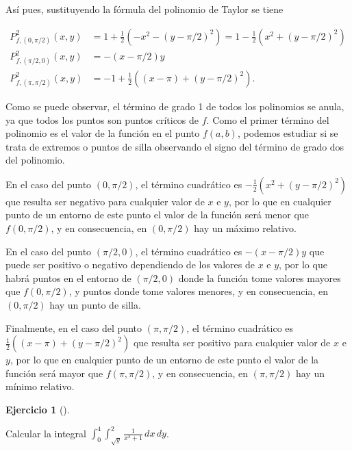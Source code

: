 \documentclass[
  a4paper,
]{scrreport}
\theoremstyle{definition}
\newtheorem{exercise}{Ejercicio}[chapter]
\theoremstyle{remark}
\begin{document}
\begin{tcolorbox}
Así pues, sustituyendo la fórmula del polinomio de Taylor se tiene

\begin{align*}
P^2_{f,(0,\pi/2)}(x,y) 
&= 1 + \frac{1}{2}(-x^2 - (y-\pi/2)^2) = 1 - \frac{1}{2}(x^2 + (y-\pi/2)^2) \\
P^2_{f,(\pi/2, 0)}(x,y) 
&= -(x-\pi/2)y \\
P^2_{f,(\pi,\pi/2)}(x,y) 
&= -1 + \frac{1}{2}((x-\pi) + (y-\pi/2)^2).
\end{align*}

Como se puede observar, el término de grado 1 de todos los polinomios se
anula, ya que todos los puntos son puntos críticos de \(f\). Como el
primer término del polinomio es el valor de la función en el punto
\(f(a,b)\), podemos estudiar si se trata de extremos o puntos de silla
observando el signo del término de grado dos del polinomio.

En el caso del punto \((0,\pi/2)\), el término cuadrático es
\(- \frac{1}{2}(x^2 + (y-\pi/2)^2)\) que resulta ser negativo para
cualquier valor de \(x\) e \(y\), por lo que en cualquier punto de un
entorno de este punto el valor de la función será menor que
\(f(0,\pi/2)\), y en consecuencia, en \((0,\pi/2)\) hay un máximo
relativo.

En el caso del punto \((\pi/2,0)\), el término cuadrático es
\(-(x-\pi/2)y\) que puede ser positivo o negativo dependiendo de los
valores de \(x\) e \(y\), por lo que habrá puntos en el entorno de
\((\pi/2,0)\) donde la función tome valores mayores que \(f(0,\pi/2)\),
y puntos donde tome valores menores, y en consecuencia, en \((0,\pi/2)\)
hay un punto de silla.

Finalmente, en el caso del punto \((\pi,\pi/2)\), el término cuadrático
es \(\frac{1}{2}((x-\pi) + (y-\pi/2)^2)\) que resulta ser positivo para
cualquier valor de \(x\) e \(y\), por lo que en cualquier punto de un
entorno de este punto el valor de la función será mayor que
\(f(\pi,\pi/2)\), y en consecuencia, en \((\pi,\pi/2)\) hay un mínimo
relativo.

\end{tcolorbox}

\begin{exercise}[]\protect\hypertarget{exr-3}{}\label{exr-3}

Calcular la integral
\(\displaystyle \int_0^4\int_{\sqrt{y}}^2 \frac{1}{x^3+1}\,dx\,dy\).

\end{exercise}
\end{document}
